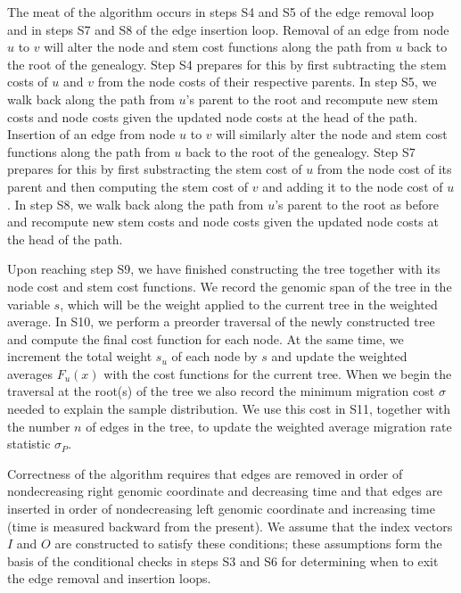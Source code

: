 The meat of the algorithm occurs in steps S4 and S5 of the edge removal loop
and in steps S7 and S8 of the edge insertion loop. Removal of an edge from
node $u$ to $v$ will alter the node and stem cost functions along the path from
$u$ back to the root of the genealogy. Step S4 prepares for this by first
subtracting the stem costs of $u$ and $v$ from the node costs of their
respective parents. In step S5, we walk back along the path from $u$'s parent to
the root and recompute new stem costs and node costs given the updated node
costs at the head of the path. Insertion of an edge from node $u$ to $v$ will 
similarly alter the node and stem cost functions along the path from
$u$ back to the root of the genealogy. Step S7 prepares for this by first
substracting the stem cost of $u$ from the node cost of its parent and then
computing the stem cost of $v$ and adding it to the node cost of $u$. In step 
S8, we walk back along the path from $u$'s parent to the root as before and 
recompute new stem costs and node costs given the updated node costs at the 
head of the path.

Upon reaching step S9, we have finished constructing the tree together with its
node cost and stem cost functions. We record the genomic span of the tree in the 
variable $s$, which will be the weight applied to the current tree in the weighted
average. In S10, we perform a preorder traversal of the newly constructed tree
and compute the final cost function for each node. At the same time, we 
increment the total weight $s_u$ of each node by $s$ and update the weighted 
averages $F_u(x)$ with the cost functions for the current tree. When we begin
the traversal at the root(s) of the tree we also record the minimum migration 
cost $\sigma$ needed to explain the sample distribution. We use this cost in
S11, together with the number $n$ of edges in the tree, to update the weighted
average migration rate statistic $\sigma_P$.

Correctness of the algorithm requires that edges are removed in order of 
nondecreasing right genomic coordinate and decreasing time and that edges are
inserted in order of nondecreasing left genomic coordinate and increasing time
(time is measured backward from the present). We assume that the index vectors
$I$ and $O$ are constructed to satisfy these conditions; these assumptions 
form the basis of the conditional checks in steps S3 and S6 for determining
when to exit the edge removal and insertion loops.
